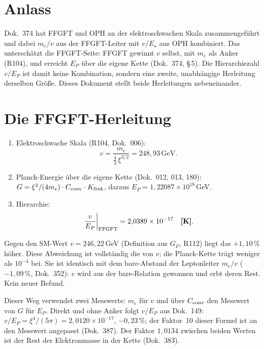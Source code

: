 \section{Anlass}

Dok.~374 hat FFGFT und OPH an der elektroschwachen Skala zusammengeführt und
dabei $m_e/v$ aus der FFGFT-Leiter mit $v/E_\star$ aus OPH kombiniert. Das
unterschätzt die FFGFT-Seite: FFGFT gewinnt $v$ selbst, mit $m_e$ als Anker (R104), und erreicht
$E_P$ über die eigene Kette (Dok.~374, §\,5). Die Hierarchiezahl $v/E_P$ ist
damit keine Kombination, sondern eine zweite, unabhängige Herleitung derselben
Größe. Dieses Dokument stellt beide Herleitungen nebeneinander.

\section{Die FFGFT-Herleitung}

\begin{enumerate}\itemsep2pt
\item Elektroschwache Skala (R104, Dok.~006):
  \begin{equation}
    v=\frac{m_e}{\tfrac43\,\xi^{3/2}}=248{,}93\,\mathrm{GeV}.
  \end{equation}
\item Planck-Energie über die eigene Kette (Dok.~012, 013, 180):
  $G=\xi^2/(4m_e)\cdot C_{\rm conv}\cdot K_{\rm frak}$, daraus
  $E_P=1{,}22087\times10^{19}$\,GeV.
\item Hierarchie:
  \begin{equation}
    \left.\frac{v}{E_P}\right|_{\rm FFGFT}=2{,}0389\times10^{-17}\quad\textbf{[K]} .
  \end{equation}
\end{enumerate}

Gegen den SM-Wert $v=246{,}22$\,GeV (Definition aus $G_F$, R112) liegt das
$+1{,}10\,\%$ höher. Diese Abweichung ist vollständig die von $v$; die
Planck-Kette trägt weniger als $10^{-4}$ bei. Sie ist identisch mit dem
bare-Abstand der Leptonleiter $m_e/v$ ($-1{,}09\,\%$, Dok.~352): $v$ wird aus
der bare-Relation gewonnen und erbt deren Rest. Kein neuer Befund.

Dieser Weg verwendet zwei Messwerte: $m_e$ für $v$ und über $C_{\rm conv}$
den Messwert von $G$ für $E_P$. Direkt und ohne Anker folgt $v/E_P$ aus
Dok.~149: $v/E_P = \xi^4/(5\pi) = 2{,}0120\times10^{-17}$, $-0{,}23\,\%$; der
Faktor~10 dieser Formel ist an den Messwert angepasst (Dok.~387). Der Faktor
$1{,}0134$ zwischen beiden Werten ist der Rest der Elektronmasse in der Kette
(Dok.~383).


